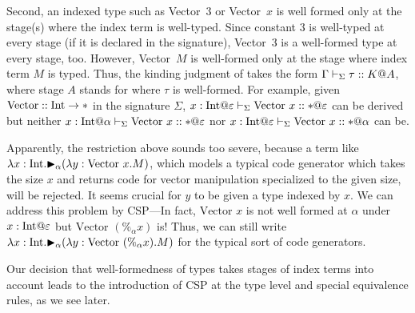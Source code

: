 Second, an indexed type such as Vector\ 3 or Vector\ $x$ is well formed only at
the stage(s) where the index term is well-typed.  Since constant \(3\) is
well-typed at every stage (if it is declared in the signature), Vector\ 3 is a
well-formed type at every stage, too.  However, Vector\ $M$ is well-formed only
at the stage where index term $M$ is typed.  Thus, the kinding judgment of \LMD
takes the form \(\Gamma\vdash_\Sigma \tau :: K @ A\), where stage $A$ stands for where
\(\tau\) is well-formed.  For example, given \(\text{Vector}:: \textrm{Int} \rightarrow
*\) in the signature \(\Sigma\), \(x:\I@\varepsilon \V \text{Vector }x :: *
@\varepsilon\) can be derived but neither \(x:\I@\alpha \V \text{Vector }x :: *
@\varepsilon\) nor \(x:\I@\varepsilon \V \text{Vector }x :: * @\alpha\) can be.


Apparently, the restriction above sounds too severe, because a term like
\(\lambda x:\textrm{Int}. {\mathop{\blacktriangleright}}_\alpha (\lambda y:\text{Vector }x.M) \), which models a
typical code generator which takes the size $x$ and returns code for vector
manipulation specialized to the given size, will be rejected. It seems crucial
for \(y\) to be given a type indexed by $x$. We can address this problem by
CSP---In fact, $\text{Vector }x$ is not well formed at $\alpha$ under
$x:\I@\varepsilon$ but $\text{Vector }(\%_\alpha x)$ is!  Thus, we can still
write \(\lambda x:\textrm{Int}. {\mathop{\blacktriangleright}}_\alpha (\lambda y:\text{Vector }(\%_\alpha x).M) \)
for the typical sort of code generators.


Our decision that well-formedness of types takes stages of index terms into
account leads to the introduction of CSP at the type level and special
equivalence rules, as we see later.
